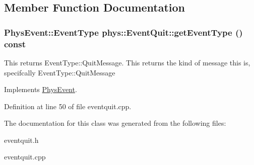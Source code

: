 \subsection{Member Function Documentation}
\hypertarget{classphys_1_1EventQuit_a602a189d70441fdfaaae6aa29761ea43}{
\subsubsection[{getEventType}]{\setlength{\rightskip}{0pt plus 5cm}PhysEvent::EventType phys::EventQuit::getEventType () const}}
\label{dd/dea/classphys_1_1EventQuit_a602a189d70441fdfaaae6aa29761ea43}


This returns EventType::QuitMessage. This returns the kind of message this is, specifcally EventType::QuitMessage 

Implements \hyperlink{classPhysEvent}{PhysEvent}.

Definition at line 50 of file eventquit.cpp.

The documentation for this class was generated from the following files:\begin{DoxyCompactItemize}
\item 
eventquit.h\item 
eventquit.cpp\end{DoxyCompactItemize}
